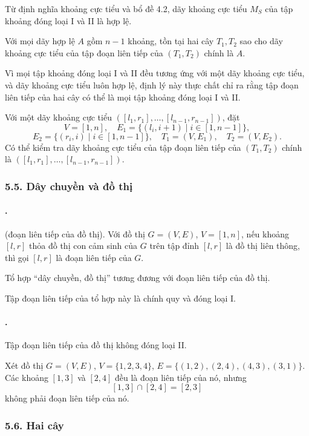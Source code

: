 \documentclass[11pt]{article}
\begin{document}
Từ định nghĩa khoảng cực tiểu và bổ đề 4.2, dãy khoảng cực tiểu $M_S$ của tập
khoảng đóng loại I và II là hợp lệ.

 Với mọi dãy hợp lệ $A$ gồm $n-1$ khoảng, tồn tại hai cây
$T_1,T_2$ sao cho dãy khoảng cực tiểu của tập đoạn liên tiếp của $(T_1,T_2)$
chính là $A$.

Vì mọi tập khoảng đóng loại I và II đều tương ứng với một dãy khoảng cực tiểu,
và dãy khoảng cực tiểu luôn hợp lệ, định lý này thực chất chỉ ra rằng tập đoạn
liên tiếp của hai cây có thể là mọi tập khoảng đóng loại I và II.

Với một dãy khoảng cực tiểu
$([l_1,r_1],\ldots,[l_{n-1},r_{n-1}])$, đặt
\[
  V=[1,n],\quad
  E_1=\{(l_i,i+1)\mid i\in[1,n-1]\},
\]
\[
  E_2=\{(r_i,i)\mid i\in[1,n-1]\},\quad
  T_1=(V,E_1),\quad T_2=(V,E_2).
\]
Có thể kiểm tra dãy khoảng cực tiểu của tập đoạn liên tiếp của $(T_1,T_2)$
chính là $([l_1,r_1],\ldots,[l_{n-1},r_{n-1}])$.

\subsubsection*{5.5. Dây chuyền và đồ thị}

\paragraph{.}
 (đoạn liên tiếp của đồ thị). Với đồ thị $G=(V,E)$,
$V=[1,n]$, nếu khoảng $[l,r]$ thỏa đồ thị con cảm sinh của $G$ trên tập đỉnh
$[l,r]$ là đồ thị liên thông, thì gọi $[l,r]$ là đoạn liên tiếp của $G$.

Tổ hợp ``dây chuyền, đồ thị'' tương đương với đoạn liên tiếp của đồ thị.

Tập đoạn liên tiếp của tổ hợp này là chính quy và đóng loại I.

\paragraph{.}
Tập đoạn liên tiếp của đồ thị không đóng loại II.

Xét đồ thị $G=(V,E)$, $V=\{1,2,3,4\}$,
$E=\{(1,2),(2,4),(4,3),(3,1)\}$. Các khoảng $[1,3]$ và $[2,4]$ đều là đoạn
liên tiếp của nó, nhưng
\[
  [1,3]\cap[2,4]=[2,3]
\]
không phải đoạn liên tiếp của nó.

\subsubsection*{5.6. Hai cây}
\end{document}
